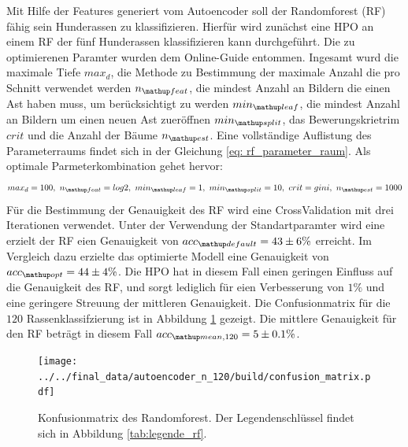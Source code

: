 Mit Hilfe der Features generiert vom Autoencoder soll der
Randomforest (RF) fähig sein Hunderassen zu klassifizieren.
Hierfür wird zunächst eine HPO an einem RF der fünf Hunderassen klassifizieren kann
durchgeführt. Die zu optimierenen Paramter
wurden dem Online-Guide \cite{RF_parameterraum} entommen. Ingesamt
wurd die maximale Tiefe $max_d$, die Methode zu Bestimmung der maximale Anzahl die pro Schnitt verwendet werden
$n\ua{feat}$, die mindest Anzahl an Bildern die einen Ast haben muss, um berücksichtigt zu werden
$min\ua{leaf}$, die mindest  Anzahl an Bildern um einen neuen Ast zueröffnen $min\ua{split}$,
das Bewerungskrietrim $crit$ und die Anzahl der Bäume $n\ua{est}$.
Eine vollständige Auflistung des Parameterraums findet sich in der Gleichung \eqref{eq: rf_parameter_raum}.
Als optimale Parmeterkombination gehet hervor:
\begin{equation*}
  max_d = 100,\,\, n\ua{feat}= log2, \,\, min\ua{leaf}= 1,\,\, min\ua{split}=10, \,\,   crit= gini, \,\, n\ua{est}=1000
\end{equation*}
Für die Bestimmung der Genauigkeit des RF wird eine CrossValidation mit
drei Iterationen verwendet. Unter der Verwendung der Standartparamter wird eine
erzielt der RF eien Genauigkeit von $acc\ua{default}=43\pm6\%$ erreicht.
Im Vergleich dazu erzielte das optimierte Modell eine Genauigkeit von $acc\ua{opt}=44\pm4\%$.
Die HPO hat in diesem Fall einen geringen Einfluss auf die Genauigkeit des RF,
und sorgt lediglich für eien Verbesserung von $1\%$ und eine geringere Streuung
der mittleren Genauigkeit.
Die Confusionmatrix für die $120$ Rassenklassifzierung ist in Abbildung
\ref{fig:Confusionmatrix_rf} gezeigt. Die mittlere Genauigkeit für den
RF beträgt in diesem Fall $acc\ua{mean,120}=5\pm0.1\%$.
\begin{figure}
\centering
\texttt{[image: ../../final\_data/autoencoder\_n\_120/build/confusion\_matrix.pdf]}
\caption{Konfusionmatrix des Randomforest. Der Legendenschlüssel findet sich in
Abbildung \ref{tab:legende_rf}.}
\label{fig:Confusionmatrix_rf}
\end{figure}
